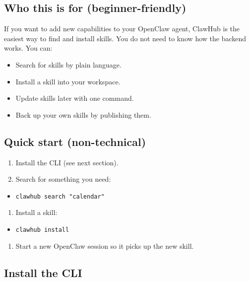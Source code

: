 \subsection{Who this is for (beginner-friendly)}


If you want to add new capabilities to your OpenClaw agent, ClawHub is the easiest way to find and install skills. You do not need to know how the backend works. You can:

\begin{itemize}
  \item Search for skills by plain language.
  \item Install a skill into your workspace.
  \item Update skills later with one command.
  \item Back up your own skills by publishing them.
\end{itemize}


\subsection{Quick start (non-technical)}


\begin{enumerate}
  \item Install the CLI (see next section).
  \item Search for something you need:
\end{enumerate}

\begin{itemize}
  \item \texttt{clawhub search "calendar"}
\end{itemize}

\begin{enumerate}
  \item Install a skill:
\end{enumerate}

\begin{itemize}
  \item \texttt{clawhub install }
\end{itemize}

\begin{enumerate}
  \item Start a new OpenClaw session so it picks up the new skill.
\end{enumerate}


\subsection{Install the CLI}


